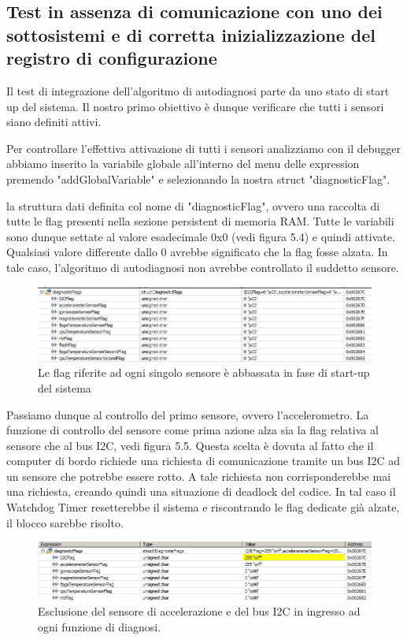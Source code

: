 \documentclass[LaM,binding=0.6cm]{../sapthesis}
\begin{document}
\subsection{Test in assenza di comunicazione con uno dei sottosistemi e di corretta inizializzazione
del registro di configurazione}
Il test di integrazione dell'algoritmo di autodiagnosi parte da uno stato di start up del sistema. Il nostro primo obiettivo è dunque verificare che tutti i sensori siano definiti attivi. 

Per controllare l'effettiva attivazione di tutti i sensori analizziamo con il debugger abbiamo inserito la variabile globale all'interno del menu delle expression premendo "addGlobalVariable" e selezionando la nostra struct "diagnosticFlag". 

la struttura dati definita col nome di "diagnosticFlag", ovvero una raccolta di tutte le flag presenti nella sezione persistent di memoria RAM. Tutte le variabili sono dunque settate al valore esadecimale 0x0 (vedi figura 5.4) e quindi attivate. Qualsiasi valore differente dallo 0 avrebbe significato che la flag fosse alzata. In tale caso, l'algoritmo di autodiagnosi non avrebbe controllato il suddetto sensore.
\begin{figure}[htbp]
\centerline{\includegraphics[scale=0.6]{examples/1_diagnosticFlagStart.JPG}}
\caption{Le flag riferite ad ogni singolo sensore è abbassata in fase di start-up del sistema}
\label{fig}
\end{figure}
\vspace{0.5cm}
Passiamo dunque al controllo del primo sensore, ovvero l'accelerometro. La funzione di controllo del sensore come prima azione alza sia la flag relativa al sensore che al bus I2C, vedi figura 5.5. Questa scelta è dovuta al fatto che il computer di bordo richiede una richiesta di comunicazione tramite un bus I2C ad un sensore che potrebbe essere rotto. A tale richiesta non corrisponderebbe mai una richiesta, creando quindi una situazione di deadlock del codice. 
In tal caso il Watchdog Timer resetterebbe il sistema e riscontrando le flag dedicate già alzate, il blocco sarebbe risolto.\newline
\begin{figure}[htbp]
\centerline{\includegraphics[scale=0.65]{examples/2_startAccelorometerCheck.JPG}}
\caption{Esclusione del sensore di accelerazione e del bus I2C in ingresso ad ogni funzione di diagnosi.}
\label{fig}
\end{figure}
\vspace{0.5cm}
\end{document}

